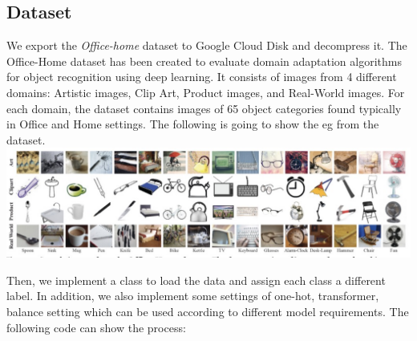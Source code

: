 \documentclass[11pt]{article}
\makeatletter
\def\maxwidth{\ifdim\Gin@nat@width>\linewidth\linewidth
    \else\Gin@nat@width\fi}
\let\Oldincludegraphics\includegraphics
\renewcommand{\includegraphics}[1]{\Oldincludegraphics[width=.8\maxwidth]{#1}}
\makeatother
\begin{document}
    \hypertarget{dataset}{%
\subsection{Dataset}\label{dataset}}

We export the \emph{Office-home} dataset to Google Cloud Disk and
decompress it. The Office-Home dataset has been created to evaluate
domain adaptation algorithms for object recognition using deep learning.
It consists of images from 4 different domains: Artistic images, Clip
Art, Product images, and Real-World images. For each domain, the dataset
contains images of 65 object categories found typically in Office and
Home settings. The following is going to show the eg from the dataset.
\includegraphics{imgs/dataset.jpg}

    Then, we implement a class to load the data and assign each class a
different label. In addition, we also implement some settings of
one-hot, transformer, balance setting which can be used according to
different model requirements. The following code can show the process:
\end{document}
